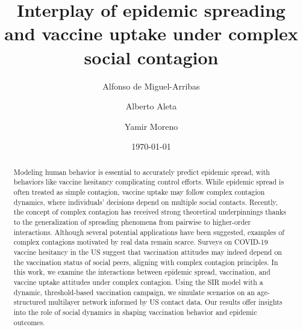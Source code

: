 \documentclass[
 reprint,
 amsmath,amssymb,
 aps,
]{revtex4-2}
\begin{document}

\title{Interplay of epidemic spreading and vaccine uptake under complex social contagion}

\author{Alfonso de Miguel-Arribas}

\author{Alberto Aleta}

\author{Yamir Moreno}

\date{\today}

\begin{abstract}
Modeling human behavior is essential to accurately predict epidemic spread, with behaviors like vaccine hesitancy complicating control efforts. While epidemic spread is often treated as simple contagion, vaccine uptake may follow complex contagion dynamics, where individuals’ decisions depend on multiple social contacts. Recently, the concept of complex contagion has received strong theoretical underpinnings thanks to the generalization of spreading phenomena from pairwise to higher-order interactions. Although several potential applications have been suggested, examples of complex contagions motivated by real data remain scarce. Surveys on COVID-19 vaccine hesitancy in the US suggest that vaccination attitudes may indeed depend on the vaccination status of social peers, aligning with complex contagion principles. In this work, we examine the interactions between epidemic spread, vaccination, and vaccine uptake attitudes under complex contagion. Using the SIR model with a dynamic, threshold-based vaccination campaign, we simulate scenarios on an age-structured multilayer network informed by US contact data. Our results offer insights into the role of social dynamics in shaping vaccination behavior and epidemic outcomes.
\end{abstract}
\end{document}
